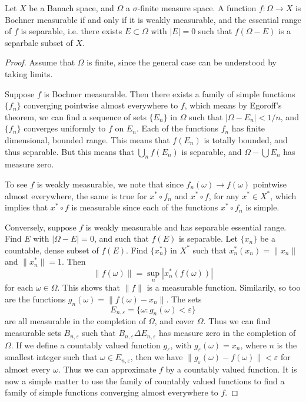 \begin{theorem}[Pettis]
    Let $X$ be a Banach space, and $\Omega$ a $\sigma$-finite measure space. A function $f: \Omega \to X$ is Bochner measurable if and only if it is weakly measurable, and the essential range of $f$ is separable, i.e. there exists $E \subset \Omega$ with $|E| = 0$ such that $f(\Omega - E)$ is a separbale subset of $X$.
\end{theorem}
\begin{proof}
    Assume that $\Omega$ is finite, since the general case can be understood by taking limits.

    Suppose $f$ is Bochner measurable. Then there exists a family of simple functions $\{ f_n \}$ converging pointwise almost everywhere to $f$, which means by Egoroff's theorem, we can find a sequence of sets $\{ E_n \}$ in $\Omega$ such that $|\Omega - E_n| < 1/n$, and $\{ f_n \}$ converges uniformly to $f$ on $E_n$. Each of the functions $f_n$ has finite dimensional, bounded range. This means that $f(E_n)$ is totally bounded, and thus separable. But this means that $\bigcup_n f(E_n)$ is separable, and $\Omega - \bigcup E_n$ has measure zero.

    To see $f$ is weakly measurable, we note that since $f_n(\omega) \to f(\omega)$ pointwise almost everywhere, the same is true for $x^* \circ f_n$ and $x^* \circ f$, for any $x^* \in X^*$, which implies that $x^* \circ f$ is measurable since each of the functions $x^* \circ f_n$ is simple.

    Conversely, suppose $f$ is weakly measurable and has separable essential range. Find $E$ with $|\Omega - E| = 0$, and such that $f(E)$ is separable. Let $\{ x_n \}$ be a countable, dense subset of $f(E)$. Find $\{ x_n^* \}$ in $X^*$ such that $x_n^*(x_n) = \| x_n \|$ and $\| x_n^* \| = 1$. Then
    \[ \| f(\omega) \| = \sup_n | x_n^*(f(\omega)) | \]
    for each $\omega \in \Omega$. This shows that $\| f \|$ is a measurable function. Similarily, so too are the functions $g_n(\omega) = \| f(\omega) - x_n \|$. The sets
    \[ E_{n,\varepsilon} = \{ \omega: g_n(\omega) < \varepsilon \} \]
    are all measurable in the completion of $\Omega$, and cover $\Omega$. Thus we can find measurable sets $B_{n,\varepsilon}$ such that $B_{n,\varepsilon} \Delta E_{n,\varepsilon}$ has measure zero in the completion of $\Omega$. If we define a countably valued function $g_\varepsilon$, with $g_\varepsilon(\omega) = x_n$, where $n$ is the smallest integer such that $\omega \in E_{n,\varepsilon}$, then we have $\| g_\varepsilon(\omega) - f(\omega) \| < \varepsilon$ for almost every $\omega$. Thus we can approximate $f$ by a countably valued function. It is now a simple matter to use the family of countably valued functions to find a family of simple functions converging almost everywhere to $f$.
\end{proof}

